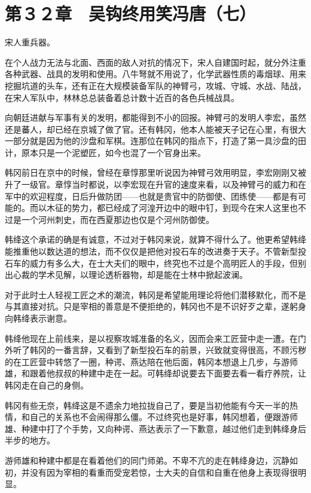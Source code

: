 \section{第３２章　吴钩终用笑冯唐（七）}

宋人重兵器。

在个人战力无法与北面、西面的敌人对抗的情况下，宋人自建国时起，就分外注重各种武器、战具的发明和使用。八牛弩就不用说了，化学武器性质的毒烟球、用来挖掘坑道的头车，还有正在大规模装备军队的神臂弓，攻城、守城、水战、陆战，在宋人军队中，林林总总装备着总计数十近百的各色兵械战具。

向朝廷进献与军事有关的发明，都能得到不小的回报。神臂弓的发明人李宏，虽然还是蕃人，却已经在京城了做了官。还有韩冈，他本人能被天子记在心里，有很大一部分就是因为他的沙盘和军棋。连那位在韩冈的指点下，打造了第一具沙盘的田计，原本只是一个泥塑匠，如今也混了一个官身出来。

韩冈前日在京中的时候，曾经在章惇那里听说因为神臂弓效用明显，李宏刚刚又被升了一级官。章惇当时都说，以李宏现在升官的速度来看，以及神臂弓的威力和在军中的欢迎程度，日后升做防团——也就是贵官中的防御使、团练使——都是有可能的。而以木征的势力，都已经成了河湟开边中的眼中钉，到现今在宋人这里也不过是一个河州刺史，而在西夏那边也仅是个河州防御使。

韩绛这个承诺的确是有诚意，不过对于韩冈来说，就算不得什么了。他更希望韩绛能推重他以数达道的想法，而不仅仅是把他对投石车的改进奏于天子。不管新型投石车的威力有多么大，在士大夫们的眼中，终究也不过是个高明匠人的手段，但别出心裁的学术见解，以理论透析器物，却是能在士林中掀起波澜。

对于此时士人轻视工匠之术的潮流，韩冈是希望能用理论将他们潜移默化，而不是与其直接对抗。只是宰相的善意是不便拒绝的，韩冈也不是不识好歹之辈，遂躬身向韩绛表示谢意。

韩绛他现在上前线来，是以视察攻城准备的名义，因而会来工匠营中走一遭。在门外听了韩冈的一番言辞，又看到了新型投石车的前景，兴致就变得很高，不顾污秽的在工匠营中转悠了一圈，种谔、燕达陪在他后面，韩冈本想退上几步，与游师雄，和跟着他叔叔的种建中走在一起。可韩绛却说要去下面要去看一看疗养院，让韩冈走在自己的身侧。

韩冈有些无奈，韩绛这是不遗余力地拉拢自己了，要是当初他能有今天一半的热情，和自己的关系也不会闹得那么僵。不过终究也是好事，韩冈想着，便跟游师雄、种建中打了个手势，又向种谔、燕达表示了一下歉意，越过他们走到韩绛身后半步的地方。

游师雄和种建中都是在看着他们的同门师弟。不卑不亢的走在韩绛身边，沉静如初，并没有因为宰相的看重而受宠若惊，士大夫的自信和自重在他身上表现得很明显。

